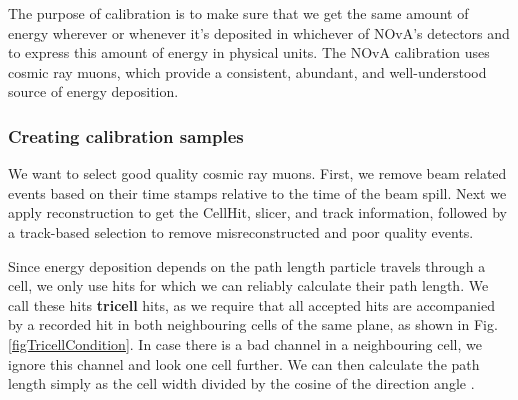 
The purpose of calibration is to make sure that we get the same amount of energy wherever or whenever it's deposited in whichever of NOvA's detectors and to express this amount of energy in physical units. The NOvA calibration uses cosmic ray muons, which provide a consistent, abundant, and well-understood source of energy deposition.



\subsubsection*{Creating calibration samples}\label{secCreatingCalibrationSamples}

We want to select good quality cosmic ray muons. First, we remove beam related events based on their time stamps relative to the time of the beam spill. Next we apply reconstruction to get the CellHit, slicer, and track information, followed by a track-based selection to remove misreconstructed and poor quality events.

Since energy deposition depends on the path length particle travels through a cell, we only use hits for which we can reliably calculate their path length. We call these hits \textbf{tricell} hits, as we require that all accepted hits are accompanied by a recorded hit in both neighbouring cells of the same plane, as shown in Fig. \ref{figTricellCondition}. In case there is a bad channel in a neighbouring cell, we ignore this channel and look one cell further. We can then calculate the path length simply as the cell width divided by the cosine of the direction angle \cite{NOVA-doc-13579,NOVA-doc-7410}.

